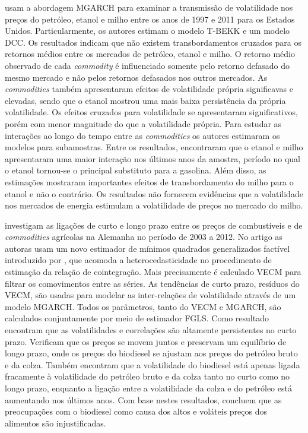 	 usam a abordagem MGARCH para examinar a transmissão de volatilidade nos preços do petróleo, etanol e milho entre os anos de 1997 e 2011 para os Estados Unidos.  Particularmente, os autores estimam o modelo T-BEKK e um modelo DCC. Os resultados indicam que não existem transbordamentos cruzados para os retornos médios entre os   mercados de petróleo, etanol e milho. O retorno médio observado de cada \emph{commodity} é influenciado somente pelo retorno defasado do mesmo mercado e não pelos retornos defasados nos outros mercados. As \emph{commodities} também apresentaram efeitos de volatilidade própria significavas e elevadas, sendo que o etanol mostrou uma mais baixa persistência da própria volatilidade. Os efeitos cruzados para volatilidade se apresentaram significativos, porém com menor magnitude do que a volatilidade própria. Para estudar as interações ao longo do tempo entre as \emph{commodities} os autores estimaram os modelos para subamostras. Entre os resultados, encontraram  que o etanol e milho apresentaram uma maior interação nos últimos anos da amostra, período no qual o etanol tornou-se o principal substituto para a gasolina. Além disso, as estimações mostraram importantes efeitos de transbordamento do milho para o etanol e não o contrário.  Os resultados não fornecem evidências que a volatilidade nos mercados de energia estimulam a volatilidade de preços no mercado do milho. 
	
	 investigam as ligações de curto e longo prazo entre os preços de combustíveis e de \emph{commodities} agrícolas na Alemanha no período de 2003 a 2012. No artigo as autoras usam um novo estimador de mínimos quadrados generalizados  factível  introduzido por , que acomoda a heterocedasticidade no procedimento de estimação da relação de cointegração. Mais precisamente é calculado VECM para filtrar os comovimentos entre as séries. As tendências de curto prazo, resíduos do VECM, são usadas para modelar as inter-relações de volatilidade através de um modelo MGARCH. Todos os parâmetros, tanto do VECM e MGARCH, são calculados conjuntamente por meio de estimador FGLS. Como resultado encontram que as volatilidades e correlações são altamente persistentes no curto prazo. Verificam que os preços se movem juntos e preservam um equilíbrio de longo prazo,  onde os preços do biodiesel se ajustam aos preços do petróleo bruto e da colza. Também encontram que a volatilidade do biodiesel está apenas ligada fracamente à volatilidade do petróleo bruto e da colza tanto no curto como no longo prazo, enquanto a ligação entre a volatilidade da colza e do petróleo  está aumentando nos últimos anos. Com base nestes resultados, concluem que as preocupações com o biodiesel como causa dos altos e voláteis  preços dos alimentos são  injustificadas.
	
